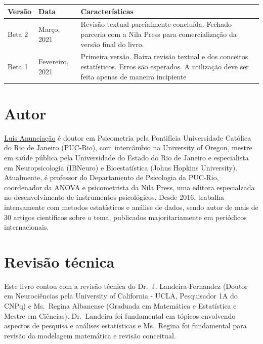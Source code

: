 \documentclass[
]{book}
\begin{document}
\begin{longtable}[]{@{}
  >{\raggedright\arraybackslash}p{}
  >{\raggedright\arraybackslash}p{}
  >{\raggedright\arraybackslash}p{}@{}}
\toprule
Versão & Data & Características \\
\midrule
\endhead
Beta 2 & Março, 2021 & Revisão textual parcialmente concluída. Fechado parceria com a Nila Press para comercialização da versão final do livro. \\
Beta 1 & Fevereiro, 2021 & Primeira versão. Baixa revisão textual e dos conceitos estatísticos. Erros são esperados. A utilização deve ser feita apenas de maneira incipiente \\
\bottomrule
\end{longtable}

\hypertarget{autor}{%
\section{Autor}\label{autor}}

\href{http://lattes.cnpq.br/3982200733248687}{Luis Anunciação} é doutor em Psicometria pela Pontifícia Universidade Católica do Rio de Janeiro (PUC-Rio), com intercâmbio na University of Oregon, mestre em saúde pública pela Universidade do Estado do Rio de Janeiro e especialista em Neuropsicologia (IBNeuro) e Bioestatística (Johns Hopkins University). Atualmente, é professor do Departamento de Psicologia da PUC-Rio, coordenador da ANOVA e psicometrista da Nila Press, uma editora especialzada no desenvolvimento de instrumentos psicológicos. Desde 2016, trabalha intensamente com metodos estatísticos e análise de dados, sendo autor de mais de 30 artigos científicos sobre o tema, publicados majoritariamente em periódicos internacionais.

\hypertarget{revisuxe3o-tuxe9cnica}{%
\section{Revisão técnica}\label{revisuxe3o-tuxe9cnica}}

Este livro contou com a revisão técnica do Dr.~J. Landeira-Fernandez (Doutor em Neurociências pela University of California - UCLA, Pesquisador 1A do CNPq) e Ms.~Regina Albanense (Graduada em Matemática e Estatística e Mestre em Ciências). Dr.~Landeira foi fundamental em tópicos envolvendo aspectos de pesquisa e análises estatísticas e Ms.~Regina foi fundamental para revisão da modelagem matemática e revisão conceitual.
\end{document}

